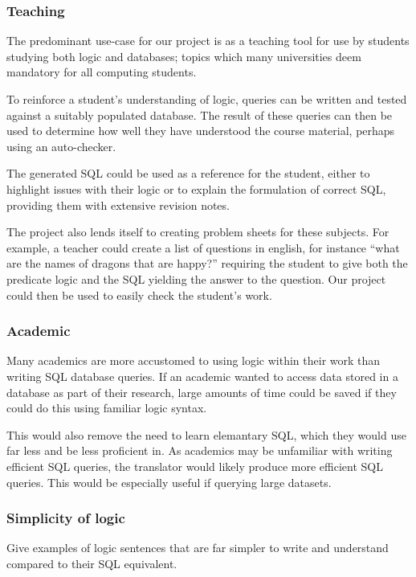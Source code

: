 \documentclass[a4paper, 11pt]{article}
\begin{document}
    \subsubsection{Teaching}
      The predominant use-case for our project is as a teaching tool for use by
      students studying both logic and databases; topics which many universities
      deem mandatory for all computing students.
    
      To reinforce a student's understanding of logic, queries can be written
      and tested against a suitably populated database. The result of these
      queries can then be used to determine how well they have understood the
      course material, perhaps using an auto-checker.

  The generated SQL could be used as a reference for the student, either to
  highlight issues with their logic or to explain the formulation of correct
  SQL, providing them with extensive revision notes.

  The project also lends itself to creating problem sheets for these subjects.
  For example, a teacher could create a list of questions in english, for instance
  ``what are the names of dragons that are happy?'' requiring the student to
  give both the predicate logic and the SQL yielding the answer to the
  question. Our project could then be used to easily check the student's work.

    \subsubsection{Academic}
      Many academics are more accustomed to using logic within their work than
      writing SQL database queries. If an academic wanted to access data stored
      in a database as part of their research, large amounts of time could be
      saved if they could do this using familiar logic syntax.

      This would also remove the need to learn elemantary SQL, which they would
      use far less and be less proficient in. As academics may be unfamiliar
      with writing efficient SQL queries, the translator would likely produce
      more efficient SQL queries. This would be especially useful if querying
      large datasets.

    \subsubsection{Simplicity of logic}
Give examples of logic sentences that are far simpler to write and understand
compared to their SQL equivalent.
\end{document}
